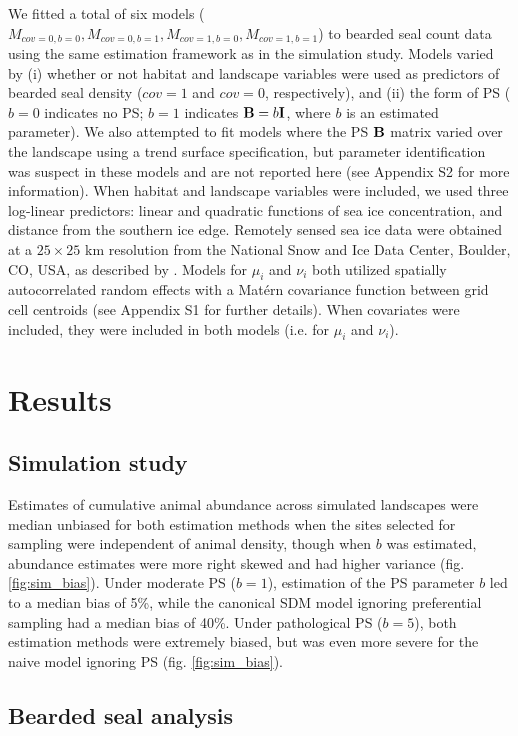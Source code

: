 \documentclass[times,mee,doublespace,]{besauth2}
\begin{document}
We fitted a total of six models ($M_{cov=0,b=0},M_{cov=0,b=1},M_{cov=1,b=0},M_{cov=1,b=1}$) to bearded seal count data using the same estimation framework as in the simulation study.  Models varied by (i) whether or not habitat and landscape variables were used as predictors of bearded seal density ($cov=1$ and $cov=0$, respectively), and (ii) the form of PS ($b=0$ indicates no PS; $b=1$ indicates ${\bf B}=b{\bf I}$, where $b$ is an estimated parameter).  We also attempted to fit models where the PS ${\bf B}$ matrix varied over the landscape using a trend surface specification, but parameter identification was suspect in these models and are not reported here (see Appendix S2 for more information).  When habitat and landscape variables were included, we used three log-linear predictors: linear and quadratic functions of sea ice concentration, and distance from the southern ice edge.  Remotely sensed sea ice data were obtained at a $25 \times 25$ km resolution from the National Snow and Ice Data Center, Boulder, CO, USA, as described by \citet{ConnEtAl2014}.  Models for $\mu_i$ and $\nu_i$ both utilized spatially autocorrelated random effects with a Mat\'{e}rn covariance function between grid cell centroids (see Appendix S1 for further details).  When covariates were included, they were included in both models (i.e. for $\mu_i$ and $\nu_i$).


\section{Results}

\subsection{Simulation study}

Estimates of cumulative animal abundance across simulated landscapes were median unbiased for both estimation methods when the sites selected for sampling were independent of animal density, though when $b$ was estimated, abundance estimates were more right skewed and had higher variance (fig. \ref{fig:sim_bias}).  Under moderate PS ($b=1$), estimation of the PS parameter $b$ led to a median bias of 5\%, while the canonical SDM model ignoring preferential sampling had a median bias of 40\%.  Under pathological PS ($b=5$), both estimation methods were extremely biased, but was even more severe for the naive model ignoring PS (fig. \ref{fig:sim_bias}).

\subsection{Bearded seal analysis}
\end{document}
